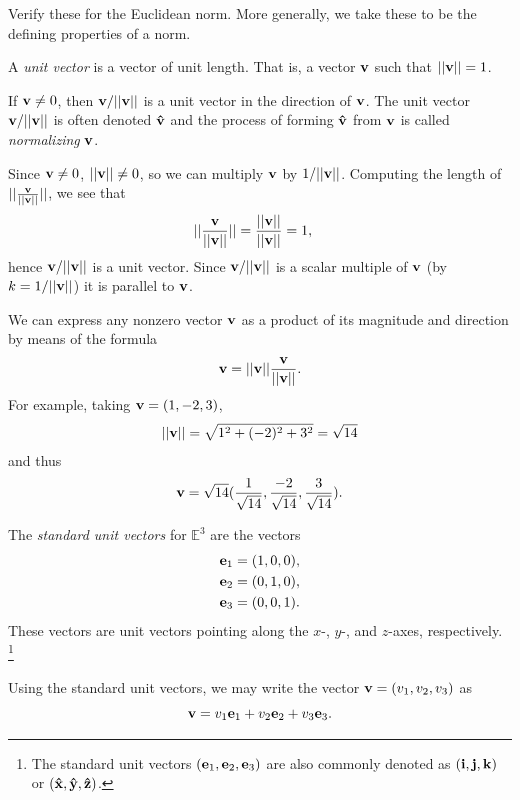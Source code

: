 \documentclass[12pt,letterpaper,reqno]{article}
\numberwithin{equation}{section}
\newcommand{\ti}[1]{\textit{#1}}
\begin{document}
\begin{pf}
Verify these for the Euclidean norm. More generally, we take these to be the defining properties of a norm.
\end{pf}

\begin{defn}
	A \ti{unit vector} is a vector of unit length. That is, a vector ${\bf v}$ such that $||{\bf v}||=1$.
\end{defn}

\begin{prop}
	If ${\bf v}\neq 0$, then ${\bf v}/||{\bf v}||$ is a unit vector in the direction of ${\bf v}$. The unit vector ${\bf v}/||{\bf v}||$ is often denoted ${\bf \hat{v}}$ and the process of forming ${\bf \hat{v}}$ from ${\bf v}$ is called \ti{normalizing} ${\bf v}$.
\end{prop}

\begin{pf}
Since ${\bf v}\neq 0$, $||{\bf v}|| \neq 0$, so we can multiply ${\bf v}$ by $1/||{\bf v}||$. Computing the length of $||\frac{{\bf v}}{||{\bf v}||}||$, we see that 
\begin{align*}
	||\frac{{\bf v}}{||{\bf v}||}||&=\frac{||{\bf v}||}{||{\bf v}||}=1,
\end{align*} 
hence ${\bf v}/||{\bf v}||$ is a unit vector. Since ${\bf v}/||{\bf v}||$ is a scalar multiple of ${\bf v}$ (by $k=1/||{\bf v}||$) it is parallel to ${\bf v}$.
\end{pf}

\begin{example}
	We can express any nonzero vector ${\bf v}$ as a product of its magnitude and direction by means of the formula
	\begin{align*}
		{\bf v}=||{\bf v}||\frac{{\bf v}}{||{\bf v}||}.
	\end{align*}
	For example, taking ${\bf v}=(1,-2,3)$,
	\begin{align*}
		||{\bf v}||=\sqrt{1^2+(-2)^2+3^2}=\sqrt{14}
	\end{align*}
	and thus
	\begin{align*}
		{\bf v}=\sqrt{14}(\frac{1}{\sqrt{14}},\frac{-2}{\sqrt{14}},\frac{3}{\sqrt{14}}).
	\end{align*}
\end{example}


\begin{defn}
	 The \ti{standard unit vectors} for $\mathbb{E}^3$ are the vectors
	\begin{align*}
		{\bf e}_1&=(1,0,0), \\
		{\bf e}_2&=(0,1,0), \\
		{\bf e}_3&=(0,0,1). \\
	\end{align*}
These vectors are unit vectors pointing along the $x$-, $y$-, and $z$-axes, respectively. \footnote{The standard unit vectors $({\bf e}_1,{\bf e}_2,{\bf e}_3)$ are also commonly denoted as $({\bf i}, {\bf j}, {\bf k})$ or $({\bf \hat{x}}, {\bf \hat{y}}, {\bf \hat{z}})$.}	
\end{defn}
Using the standard unit vectors, we may write the vector ${\bf v}=(v_1,v_2,v_3)$ as $${\bf v}=v_1{\bf e}_1+v_2{\bf e}_2+v_3{\bf e}_3.$$
\end{document}
